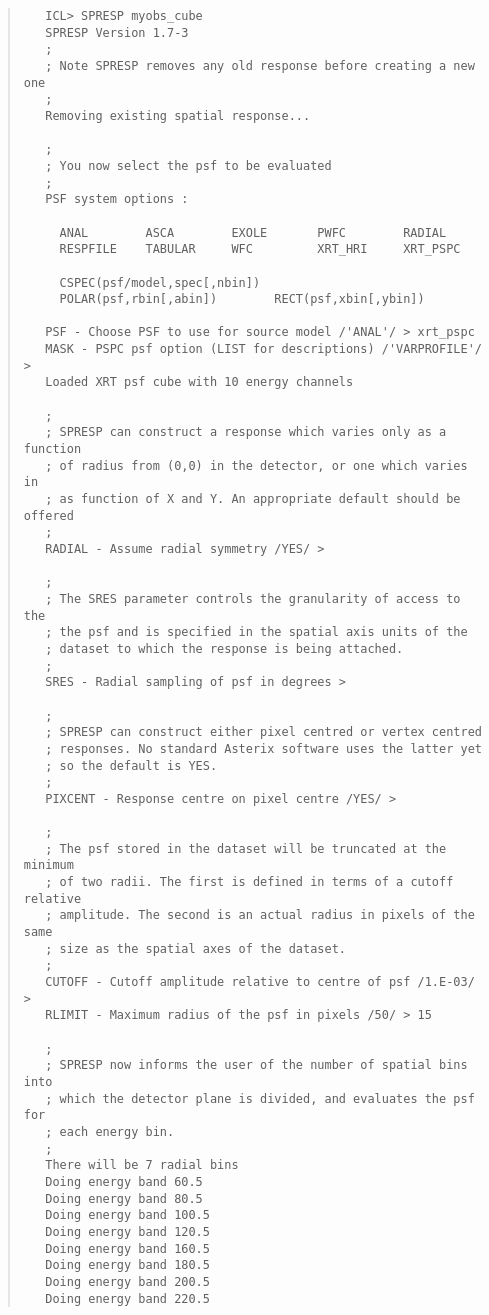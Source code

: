 \documentclass{book}
\renewcommand{\_}{{\tt\char'137}}     %
\begin{document}
\begin{quote}\begin{verbatim}
   ICL> SPRESP myobs_cube
   SPRESP Version 1.7-3
   ;
   ; Note SPRESP removes any old response before creating a new one
   ;
   Removing existing spatial response...
 
   ;
   ; You now select the psf to be evaluated
   ;
   PSF system options :
 
     ANAL        ASCA        EXOLE       PWFC        RADIAL
     RESPFILE    TABULAR     WFC         XRT_HRI     XRT_PSPC
 
     CSPEC(psf/model,spec[,nbin])
     POLAR(psf,rbin[,abin])        RECT(psf,xbin[,ybin])
 
   PSF - Choose PSF to use for source model /'ANAL'/ > xrt_pspc
   MASK - PSPC psf option (LIST for descriptions) /'VARPROFILE'/ >
   Loaded XRT psf cube with 10 energy channels
 
   ;
   ; SPRESP can construct a response which varies only as a function
   ; of radius from (0,0) in the detector, or one which varies in
   ; as function of X and Y. An appropriate default should be offered
   ;
   RADIAL - Assume radial symmetry /YES/ >
 
   ;
   ; The SRES parameter controls the granularity of access to the
   ; the psf and is specified in the spatial axis units of the
   ; dataset to which the response is being attached.
   ;
   SRES - Radial sampling of psf in degrees >
 
   ;
   ; SPRESP can construct either pixel centred or vertex centred
   ; responses. No standard Asterix software uses the latter yet
   ; so the default is YES.
   ;
   PIXCENT - Response centre on pixel centre /YES/ >
 
   ;
   ; The psf stored in the dataset will be truncated at the minimum
   ; of two radii. The first is defined in terms of a cutoff relative
   ; amplitude. The second is an actual radius in pixels of the same
   ; size as the spatial axes of the dataset.
   ;
   CUTOFF - Cutoff amplitude relative to centre of psf /1.E-03/ >
   RLIMIT - Maximum radius of the psf in pixels /50/ > 15
 
   ;
   ; SPRESP now informs the user of the number of spatial bins into
   ; which the detector plane is divided, and evaluates the psf for
   ; each energy bin.
   ;
   There will be 7 radial bins
   Doing energy band 60.5
   Doing energy band 80.5
   Doing energy band 100.5
   Doing energy band 120.5
   Doing energy band 160.5
   Doing energy band 180.5
   Doing energy band 200.5
   Doing energy band 220.5
\end{verbatim}\end{quote}
\end{document}
